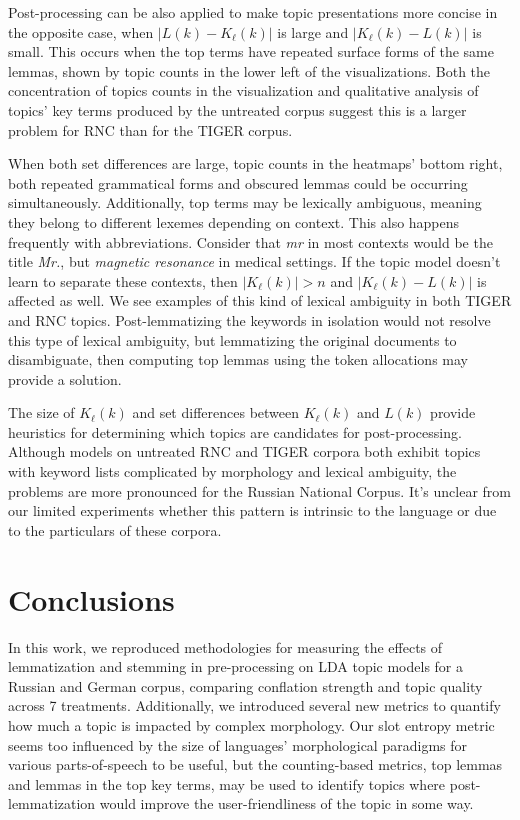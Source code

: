\documentclass[11pt,a4paper]{article}
\begin{document}
Post-processing can be also applied to make topic presentations more concise in the opposite case, when $|L(k)-K_\ell(k)|$ is large and $|K_\ell(k) - L(k)|$ is small. This occurs when the top terms have repeated surface forms of the same lemmas, shown by topic counts in the lower left of the visualizations. Both the concentration of topics counts in the visualization and qualitative analysis of topics' key terms produced by the untreated corpus suggest this is a larger problem for RNC than for the TIGER corpus.

When both set differences are large, topic counts in the heatmaps' bottom right, both repeated grammatical forms and obscured lemmas could be occurring simultaneously. Additionally, top terms may be lexically ambiguous, meaning they belong to different lexemes depending on context. This also happens frequently with abbreviations. Consider that \textit{mr} in most contexts would be the title \textit{Mr.}, but \textit{magnetic resonance} in medical settings. If the topic model doesn't learn to separate these contexts, then $|K_\ell(k)| > n$ and $|K_\ell(k) - L(k)|$ is affected as well. We see examples of this kind of lexical ambiguity in both TIGER and RNC topics. Post-lemmatizing the keywords in isolation would not resolve this type of lexical ambiguity, but lemmatizing the original documents to disambiguate, then computing top lemmas using the token allocations may provide a solution.

The size of $K_\ell(k)$ and set differences between $K_\ell(k)$ and $L(k)$ provide heuristics for determining which topics are candidates for post-processing. Although models on untreated RNC and TIGER corpora both exhibit topics with keyword lists complicated by morphology and lexical ambiguity, the problems are more pronounced for the Russian National Corpus. It's unclear from our limited experiments whether this pattern is intrinsic to the language or due to the particulars of these corpora.


\section{Conclusions}
In this work, we reproduced methodologies for measuring the effects of lemmatization and stemming in pre-processing on LDA topic models for a Russian and German corpus, comparing conflation strength and topic quality across 7 treatments. Additionally, we introduced several new metrics to quantify how much a topic is impacted by complex morphology. Our slot entropy metric seems too influenced by the size of languages' morphological paradigms for various parts-of-speech to be useful, but the counting-based metrics, top lemmas and lemmas in the top key terms, may be used to identify topics where post-lemmatization would improve the user-friendliness of the topic in some way.
\end{document}
